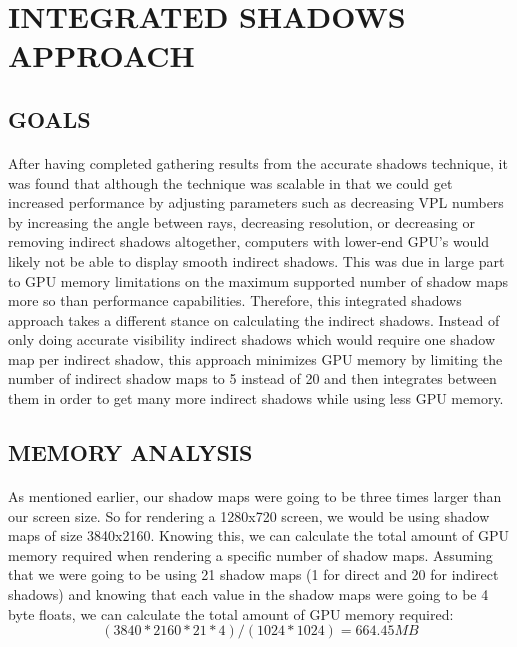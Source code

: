\section{INTEGRATED SHADOWS APPROACH} \label{sec:newApproach}
\subsection{GOALS}
\paragraph{}
After having completed gathering results from the accurate shadows technique, it was found that although the technique was scalable in that we could get increased performance by adjusting parameters such as decreasing VPL numbers by increasing the angle between rays, decreasing resolution, or decreasing or removing indirect shadows altogether, computers with lower-end GPU's would likely not be able to display smooth indirect shadows.  This was due in large part to GPU memory limitations on the maximum supported number of shadow maps more so than performance capabilities.  Therefore, this integrated shadows approach takes a different stance on calculating the indirect shadows.  Instead of only doing accurate visibility indirect shadows which would require one shadow map per indirect shadow, this approach minimizes GPU memory by limiting the number of indirect shadow maps to 5 instead of 20 and then integrates between them in order to get many more indirect shadows while using less GPU memory.

\subsection{MEMORY ANALYSIS}
\paragraph{}
As mentioned earlier, our shadow maps were going to be three times larger than our screen size.  So for rendering a 1280x720 screen, we would be using shadow maps of size 3840x2160.  Knowing this, we can calculate the total amount of GPU memory required when rendering a specific number of shadow maps.  Assuming that we were going to be using 21 shadow maps (1 for direct and 20 for indirect shadows) and knowing that each value in the shadow maps were going to be 4 byte floats, we can calculate the total amount of GPU memory required:
\begin{equation}
(3840*2160*21*4)/(1024*1024) = 664.45 MB
\end{equation}

